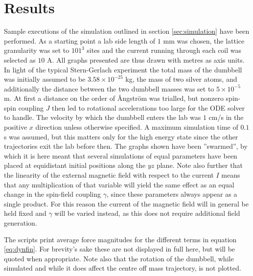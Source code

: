 \documentclass[main.tex]{subfiles}
\begin{document}
\section{Results}
Sample executions of the simulation outlined in section \ref{sec:simulation} have been
performed. As a starting point a lab side length of \(1\) mm was chosen, the lattice
granularity was set to \(101^3\) sites and the current running through each coil was
selected as \(10\) A. All graphs presented are thus drawn with metres as axis units. In light of the typical Stern-Gerlach experiment the total mass
of the dumbbell was initially assumed to be \(3.58\times 10^{-25}\) kg, the mass of two silver
atoms, and additionally the distance between the two dumbbell masses was set to \(5\times
10^{-5}\) m. At first a distance on the order of Ångström was trialled, but nonzero
spin-spin coupling \(J\) then led to rotational accelerations too large for the ODE solver
to handle. The velocity by which the dumbbell enters the lab was \(1\) cm/s in the positive
\(x\) direction unless otherwise
specified. A maximum simulation time of \(0.1\) s was
assumed, but this matters only for the high energy state
since the other
trajectories exit the lab before then. The graphs shown have been ''swarmed'', by which it
is here meant that several simulations of equal parameters have been placed at equidistant
initial positions along the \(yz\) plane. Note also further that the linearity of the
external magnetic field with respect to the current \(I\) means that any multiplication of that
variable will yield the same effect as an equal change in the spin-field coupling
\(\gamma\), since these parameters always appear as a single product. For this reason the current of the magnetic field will in general be held fixed
and \(\gamma\) will be varied instead, as this does not require additional field
generation.

The scripts print average force magnitudes for the different terms in equation
\ref{eq:dynfin}. For brevity's sake these are not displayed in full here, but will be
quoted when appropriate. Note also that the rotation of the dumbbell, while simulated and
while it does affect the centre off mass trajectory, is not plotted.
\end{document}
